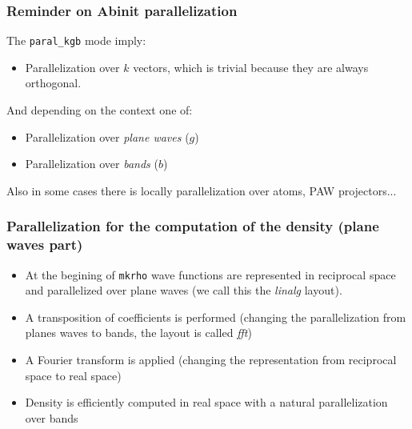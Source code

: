 \begin{frame}
  \frametitle{Reminder on Abinit parallelization}
  
  The \texttt{paral\_kgb} mode imply:
  \begin{itemize}
    \item Parallelization over $k$ vectors, which is trivial because
    they are always orthogonal.
  \end{itemize}

  And depending on the context one of:

  \begin{itemize}
    \item Parallelization over \emph{plane waves} ($g$)
    \item Parallelization over \emph{bands} ($b$)
  \end{itemize}
  Also in some cases there is locally parallelization over atoms, PAW projectors...
\end{frame}

\begin{frame}
  \frametitle{Parallelization for the computation of the density (plane waves part)}
  \begin{itemize}
    \item At the begining of \texttt{mkrho} wave functions are represented in
      reciprocal space and parallelized over plane waves (we call this the \emph{linalg} layout).
    \item A transposition of coefficients is performed (changing the parallelization from planes waves to bands, the layout is called \emph{fft}) 
    \item A Fourier transform is applied (changing the representation from reciprocal space to real space)
    \item Density is efficiently computed in real space with a natural parallelization
      over bands 
  \end{itemize}
  
  \alert{}

\end{frame}

